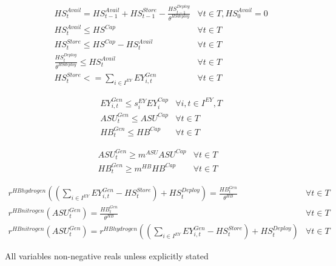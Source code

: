 \documentclass[12 pt]{article}
\begin{document}
\begin{align}
& HS^{Avail}_{t} = HS^{Avail}_{t-1} + HS^{Store}_{t-1} - \frac{HS^{Deploy}_{t-1}}{\theta^{HSdeploy}} & \forall t \in T,HS^{Avail}_{0} = 0 \\
& HS^{Avail}_{t} \leq HS^{Cap} & \forall t \in T \\
& HS^{Store}_{t} \leq HS^{Cap}-HS^{Avail}_{t} & \forall t \in T \\
&  \frac{HS^{Deploy}_{t}}{\theta^{HSdeploy}} \leq HS^{Avail}_{t} & \forall t \in T \\
& HS^{Store}_{t} <= \sum_{i \in I^{EY}}EY^{Gen}_{i,t} & \forall t \in T
\end{align}

\begin{align}
& EY^{Gen}_{i,t} \leq s^{EY}_{i}EY^{Cap}_{i} & \forall i,t \in I^{EY},T \\
& ASU^{Gen}_{t} \leq ASU^{Cap} & \forall t \in T \\
& HB^{Gen}_{t} \leq HB^{Cap} & \forall t \in T
\end{align}

\begin{align}
ASU^{Gen}_{t} \geq m^{ASU}ASU^{Cap} & \forall t \in T \\
HB^{Gen}_{t} \geq m^{HB}HB^{Cap} & \forall t \in T
\end{align}

\begin{align}
r^{HBhydrogen} ((\sum_{i \in I^{EY}}EY^{Gen}_{i,t}-HS^{Store}_{t}) + HS^{Deploy}_{t}) = \frac{HB^{Gen}_{t}}{\theta^{HB}} & \forall t \in T \\
r^{HBnitrogen}(ASU^{Gen}_{t}) = \frac{HB^{Gen}_{t}}{\theta^{HB}} & \forall t \in T \\
r^{HBnitrogen}(ASU^{Gen}_{t}) = r^{HBhydrogen}((\sum_{i \in I^{EY}}EY^{Gen}_{i,t}-HS^{Store}_{t}) +HS^{Deploy}_{t}) & \forall t \in T
\end{align}


All variables non-negative reals unless explicitly stated
\end{document}
